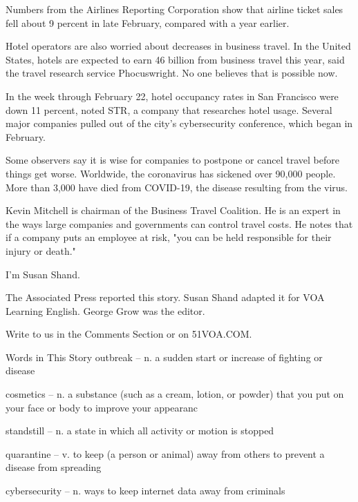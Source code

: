 Numbers from the Airlines Reporting Corporation show that airline ticket sales fell about 9 percent in late February, compared with a year earlier.

Hotel operators are also worried about decreases in business travel. In the United States, hotels are expected to earn 46 billion from business travel this year, said the travel research service Phocuswright. No one believes that is possible now.

In the week through February 22, hotel occupancy rates in San Francisco were down 11 percent, noted STR, a company that researches hotel usage. Several major companies pulled out of the city's cybersecurity conference, which began in February.

Some observers say it is wise for companies to postpone or cancel travel before things get worse. Worldwide, the coronavirus has sickened over 90,000 people. More than 3,000 have died from COVID-19, the disease resulting from the virus.

Kevin Mitchell is chairman of the Business Travel Coalition. He is an expert in the ways large companies and governments can control travel costs. He notes that if a company puts an employee at risk, "you can be held responsible for their injury or death."

I'm Susan Shand.

The Associated Press reported this story. Susan Shand adapted it for VOA Learning English. George Grow was the editor.

Write to us in the Comments Section or on 51VOA.COM.


Words in This Story
outbreak – n. a sudden start or increase of fighting or disease

cosmetics – n. a substance (such as a cream, lotion, or powder) that you put on your face or body to improve your appearanc

standstill – n. a state in which all activity or motion is stopped

quarantine – v. to keep (a person or animal) away from others to prevent a disease from spreading

cybersecurity – n. ways to keep internet data away from criminals

